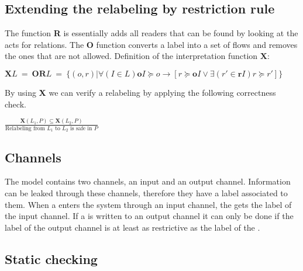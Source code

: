 \subsection{Extending the relabeling by restriction rule}




The function \textbf{R} is essentially adds all readers that can be found by looking at the acts for relations.
The \textbf{O} function converts a label into a set of flows and removes the ones that are not allowed.
Definition of the interpretation function $\textbf{X}$:
\begin{definition}
  $\textbf{X}L \ = \ \textbf{OR}L \ = \ \{(o,r)|\forall (I \in L) \textbf{o}I \succeq o \rightarrow [r \succeq \textbf{o}I \vee \exists (r' \in \textbf{r}I) r \succeq r'] \}$
\end{definition}

By using \textbf{X} we can verify a relabeling by applying the following correctness check.
\begin{definition}
  $\frac{\textbf{X}(L_1, P)\subseteq \textbf{X}(L_2,P)}{\text{Relabeling from } L_1 \text{ to } L_2 \text{ is safe in } P }$
\end{definition}

\subsection{Channels}
The model contains two channels, an input and an output channel.
Information can be leaked through these channels, therefore they have a label associated to them.
When a \xvalue{} enters the system through an input channel, the \xvalue{} gets the label of the input channel.
If a \xvalue{} is written to an output channel it can only be done if the label of the output channel is at least as restrictive as the label of the \xvalue{}.

\subsection{Static checking}
